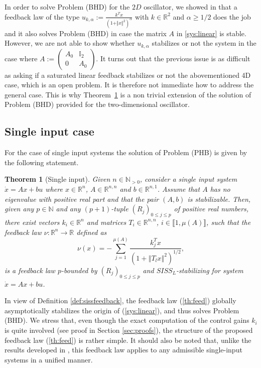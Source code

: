 \documentclass[letterpaper, 10pt]{article}
\newtheorem{theo}{Theorem}
\newcommand{\identity}{\mathbb{I}}
\newcommand{\rref}[1]{(\ref{#1})}
\newcommand{\norme}[1]{\left\Vert #1\right\Vert}
\newcommand{\reels}{\mathbb{R}}
\newcommand{\entiers}{\mathbb{N}}
\begin{document}
In order to solve Problem (BHD) for the $2D$ oscillator, we showed in \cite{LCC1} that a feedback law of the type $u_{k,\alpha}:=\frac{k^Tx}{(1+\Vert x\Vert^2)^{\alpha}}$ with $k\in\mathbb{R}^2$ and $\alpha\geq 1/2$ does the job and it also solves Problem (BHD) in case the matrix $A$ in \eqref{sys:linear} is stable. However, we are not able to show whether $u_{k,\alpha}$ stabilizes or not the system in the case where $A := \begin{pmatrix}
A_0 & \identity_2 \\
0 & A_0
\end{pmatrix}$. It turns out that the previous issue is as difficult as asking if a saturated linear feedback stabilizes or not the abovementioned 4D case, which is an open problem.  It is therefore not immediate how to address the general case. This is why Theorem~\ref{th:main} is a non trivial extension of the solution of Problem (BHD) provided for the two-dimensional oscillator.


\subsection{Single input case}

For the case of single input systems the solution of Problem (PHB) is given by the following statement.

\begin{theo}[Single input]
\label{th:main}
Given $n \in \entiers_{>0}$, consider a single input system $\dot{x}=Ax+bu$ where $x \in \reels^n$, $A \in \reels^{n,n}$ and $b\in \reels^{n,1}$. Assume that $A$ has no eigenvalue with positive real part and that the pair $(A,b)$ is stabilizable. Then, given any $p \in \entiers$ and any $(p+1)$-tuple $(R_j)_{0 \leq j \leq p}$ of positive real numbers, there exist vectors $k_i\in\reels^n$ and matrices $T_i\in\reels^{n,n}$, $i\in\llbracket1, \mu(A)\rrbracket$, such that the feedback law $\nu:\reels^n\rightarrow\reels$ defined as
\begin{equation}
\label{th:feed}
\nu(x) = - \sum\limits_{j=1}^{\mu(A)} \frac{k_j^T x}{  (1 + \norme{T_l x}^2 )^{1/2}},
\end{equation} 
is a feedback law $p$-bounded by $(R_j)_{0 \leq j \leq p}$ and $SISS_L$-stabilizing for system $\dot{x}=Ax+bu$.
\end{theo} 

In view of Definition \ref{def:sissfeedback}, the feedback law \rref{th:feed} globally asymptotically stabilizes the origin of \rref{sys:linear}, and thus solves Problem (BHD). We stress that, even though the exact computation of the control gains $k_i$ is quite involved (see proof in Section \ref{sec:proofs}), the structure of the proposed feedback law \rref{th:feed} is rather simple. It should also be noted that, unlike the results developed in \cite{LCC1}, this feedback law applies to any admissible single-input systems in a unified manner.
\end{document}
